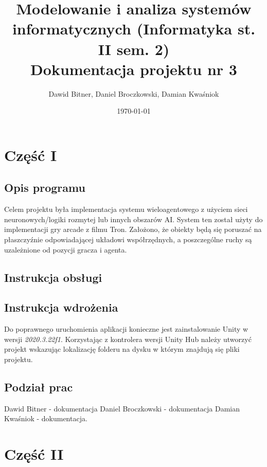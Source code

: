 \documentclass[12pt,a4paper]{article}
\begin{document}
	
	\title{Modelowanie i analiza systemów informatycznych (Informatyka st. II sem. 2)\\\small{Dokumentacja projektu nr 3}}
	\author{Dawid Bitner, Daniel Broczkowski, Damian Kwaśniok}
	\date{\today}

	\maketitle
	\newpage
	\section*{Część I}
	\subsection*{Opis programu}
	
	Celem projektu była implementacja systemu wieloagentowego z użyciem sieci neuronowych/logiki rozmytej lub innych obszarów AI. System ten został użyty do implementacji gry arcade z filmu Tron. Założono, że obiekty będą się poruszać na płaszczyźnie odpowiadającej układowi współrzędnych, a poszczególne ruchy są uzależnione od pozycji gracza i agenta.
    
	\subsection*{Instrukcja obsługi}

	\subsection{Instrukcja wdrożenia}

Do poprawnego uruchomienia aplikacji konieczne jest zainstalowanie Unity w wersji \textit{2020.3.22f1}. Korzystając z kontrolera wersji Unity Hub należy utworzyć projekt wskazując lokalizację folderu na dysku w którym znajdują się pliki projektu.

	\subsection*{Podział prac}
Dawid Bitner - dokumentacja\newline
Daniel Broczkowski - dokumentacja\newline
Damian Kwaśniok - dokumentacja.

	\newpage
	\section*{Część II}
\end{document}
